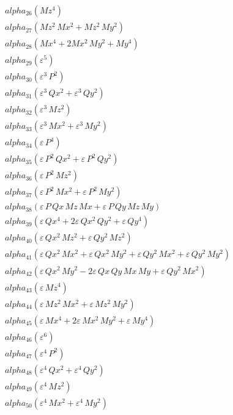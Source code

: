 \documentclass{article}
\begin{document}
\begin{align*}
  &\quad alpha_{26} \left(Mz^{4}\right) \\
  &\quad alpha_{27} \left(Mz^{2}\,Mx^{2} + Mz^{2}\,My^{2}\right) \\
  &\quad alpha_{28} \left(Mx^{4} + 2Mx^{2}\,My^{2} + My^{4}\right) \\
  &\quad alpha_{29} \left(ε^{5}\right) \\
  &\quad alpha_{30} \left(ε^{3}\,P^{2}\right) \\
  &\quad alpha_{31} \left(ε^{3}\,Qx^{2} + ε^{3}\,Qy^{2}\right) \\
  &\quad alpha_{32} \left(ε^{3}\,Mz^{2}\right) \\
  &\quad alpha_{33} \left(ε^{3}\,Mx^{2} + ε^{3}\,My^{2}\right) \\
  &\quad alpha_{34} \left(ε\,P^{4}\right) \\
  &\quad alpha_{35} \left(ε\,P^{2}\,Qx^{2} + ε\,P^{2}\,Qy^{2}\right) \\
  &\quad alpha_{36} \left(ε\,P^{2}\,Mz^{2}\right) \\
  &\quad alpha_{37} \left(ε\,P^{2}\,Mx^{2} + ε\,P^{2}\,My^{2}\right) \\
  &\quad alpha_{38} \left(ε\,P\,Qx\,Mz\,Mx + ε\,P\,Qy\,Mz\,My\right) \\
  &\quad alpha_{39} \left(ε\,Qx^{4} + 2ε\,Qx^{2}\,Qy^{2} + ε\,Qy^{4}\right) \\
  &\quad alpha_{40} \left(ε\,Qx^{2}\,Mz^{2} + ε\,Qy^{2}\,Mz^{2}\right) \\
  &\quad alpha_{41} \left(ε\,Qx^{2}\,Mx^{2} + ε\,Qx^{2}\,My^{2} + ε\,Qy^{2}\,Mx^{2} + ε\,Qy^{2}\,My^{2}\right) \\
  &\quad alpha_{42} \left(ε\,Qx^{2}\,My^{2} - 2ε\,Qx\,Qy\,Mx\,My + ε\,Qy^{2}\,Mx^{2}\right) \\
  &\quad alpha_{43} \left(ε\,Mz^{4}\right) \\
  &\quad alpha_{44} \left(ε\,Mz^{2}\,Mx^{2} + ε\,Mz^{2}\,My^{2}\right) \\
  &\quad alpha_{45} \left(ε\,Mx^{4} + 2ε\,Mx^{2}\,My^{2} + ε\,My^{4}\right) \\
  &\quad alpha_{46} \left(ε^{6}\right) \\
  &\quad alpha_{47} \left(ε^{4}\,P^{2}\right) \\
  &\quad alpha_{48} \left(ε^{4}\,Qx^{2} + ε^{4}\,Qy^{2}\right) \\
  &\quad alpha_{49} \left(ε^{4}\,Mz^{2}\right) \\
  &\quad alpha_{50} \left(ε^{4}\,Mx^{2} + ε^{4}\,My^{2}\right) \\

\end{align*}
\end{document}
